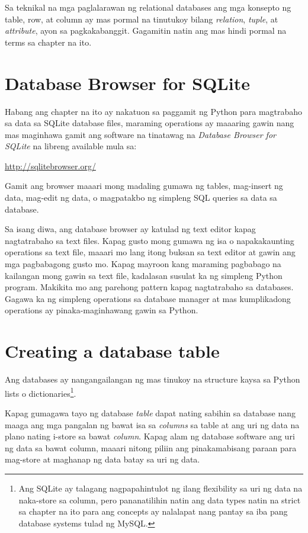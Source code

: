 \documentclass[10pt,]{book}
\begin{document}
Sa teknikal na mga paglalarawan ng relational databases ang mga konsepto
ng table, row, at column ay mas pormal na tinutukoy bilang
\emph{relation}, \emph{tuple}, at \emph{attribute}, ayon sa
pagkakabanggit. Gagamitin natin ang mas hindi pormal na terms sa chapter
na ito.

\section{Database Browser for SQLite}\label{database-browser-for-sqlite}

Habang ang chapter na ito ay nakatuon sa paggamit ng Python para
magtrabaho sa data sa SQLite database files, maraming operations ay
maaaring gawin nang mas maginhawa gamit ang software na tinatawag na
\emph{Database Browser for SQLite} na libreng available mula sa:

\url{http://sqlitebrowser.org/}

Gamit ang browser maaari mong madaling gumawa ng tables, mag-insert ng
data, mag-edit ng data, o magpatakbo ng simpleng SQL queries sa data sa
database.

Sa isang diwa, ang database browser ay katulad ng text editor kapag
nagtatrabaho sa text files. Kapag gusto mong gumawa ng isa o
napakakaunting operations sa text file, maaari mo lang itong buksan sa
text editor at gawin ang mga pagbabagong gusto mo. Kapag mayroon kang
maraming pagbabago na kailangan mong gawin sa text file, kadalasan
susulat ka ng simpleng Python program. Makikita mo ang parehong pattern
kapag nagtatrabaho sa databases. Gagawa ka ng simpleng operations sa
database manager at mas kumplikadong operations ay pinaka-maginhawang
gawin sa Python.

\section{Creating a database table}\label{creating-a-database-table}

Ang databases ay nangangailangan ng mas tinukoy na structure kaysa sa
Python lists o dictionaries\footnote{Ang SQLite ay talagang
  nagpapahintulot ng ilang flexibility sa uri ng data na naka-store sa
  column, pero pananatilihin natin ang data types natin na strict sa
  chapter na ito para ang concepts ay nalalapat nang pantay sa iba pang
  database systems tulad ng MySQL.}.

Kapag gumagawa tayo ng database \emph{table} dapat nating sabihin sa
database nang maaga ang mga pangalan ng bawat isa sa \emph{columns} sa
table at ang uri ng data na plano nating i-store sa bawat \emph{column}.
Kapag alam ng database software ang uri ng data sa bawat column, maaari
nitong piliin ang pinakamabisang paraan para mag-store at maghanap ng
data batay sa uri ng data.
\end{document}
